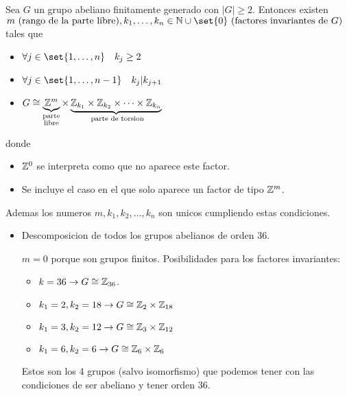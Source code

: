 \begin{theorem}
	Sea \(G \) un grupo abeliano finitamente generado con \(|G| \geq 2 \). Entonces existen \(m \text{ (rango de la parte libre)} , k_1, \ldots, k_n \in \N \cup \set{0 } \text{ (factores invariantes de }G \text{)}  \) tales que 
	\begin{itemize}
		\item \(\forall j \in \set{1,\ldots,n} \quad k_j \geq 2	\)
		\item \(\forall j \in \set{1,\ldots,n-1} \quad k_j | k_{j+1}\)
		\item \(G \cong \underbrace{\mathbb{Z}^{m}}_{\substack{\text{parte}\\ \text{libre}  } } \times \underbrace{\mathbb{Z}_{k_1}\times \mathbb{Z}_{k_2} \times \cdots \times \mathbb{Z}_{k_n}}_{\text{ parte de torsion} } \)
	\end{itemize}
	donde 
	\begin{itemize}
		\item \(\mathbb{Z}^{0} \) se interpreta como que no aparece este factor.
		\item Se incluye el caso en el que solo aparece un factor de tipo \(\mathbb{Z}^{m } \).
	\end{itemize}
	Ademas los numeros \(m,k_1, k_2, \ldots, k_n \) son unicos cumpliendo estas condiciones. 
\end{theorem}
\begin{example}
	\begin{itemize}
		\item Descomposicion de todos los grupos abelianos de orden \(36 \).
		      
		      \(m = 0\) porque son grupos finitos. Posibilidades para los factores invariantes: 
		      \begin{itemize}
			      \item \(k = 36 \rightarrow G \cong \mathbb{Z}_{36 }\).
			      \item \(k_1 = 2, k_2 = 18 \rightarrow G \cong \mathbb{Z}_2 \times \mathbb{Z}_{18}\)
			      \item \(k_1 = 3, k_2 = 12 \rightarrow G \cong \mathbb{Z}_3 \times \mathbb{Z}_{12}\)
			      \item \(k_1 = 6, k_2 = 6 \rightarrow G \cong \mathbb{Z}_6 \times \mathbb{Z}_6 \)
		      \end{itemize}
		      Estos son los 4 grupos (salvo isomorfismo) que podemos tener con las condiciones de ser abeliano y tener orden \( 36 \). 
	\end{itemize}
\end{example}
